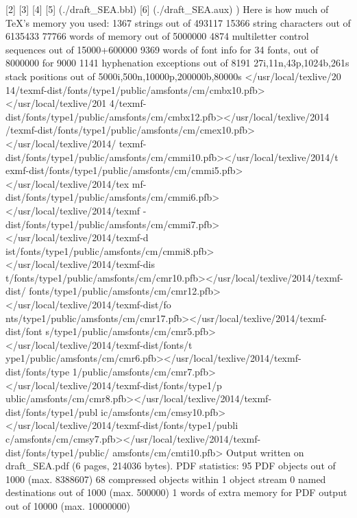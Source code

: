 [2] [3] [4] [5] (./draft_SEA.bbl) [6] (./draft_SEA.aux) ) 
Here is how much of TeX's memory you used:
 1367 strings out of 493117
 15366 string characters out of 6135433
 77766 words of memory out of 5000000
 4874 multiletter control sequences out of 15000+600000
 9369 words of font info for 34 fonts, out of 8000000 for 9000
 1141 hyphenation exceptions out of 8191
 27i,11n,43p,1024b,261s stack positions out of 5000i,500n,10000p,200000b,80000s
</usr/local/texlive/20
14/texmf-dist/fonts/type1/public/amsfonts/cm/cmbx10.pfb></usr/local/texlive/201
4/texmf-dist/fonts/type1/public/amsfonts/cm/cmbx12.pfb></usr/local/texlive/2014
/texmf-dist/fonts/type1/public/amsfonts/cm/cmex10.pfb></usr/local/texlive/2014/
texmf-dist/fonts/type1/public/amsfonts/cm/cmmi10.pfb></usr/local/texlive/2014/t
exmf-dist/fonts/type1/public/amsfonts/cm/cmmi5.pfb></usr/local/texlive/2014/tex
mf-dist/fonts/type1/public/amsfonts/cm/cmmi6.pfb></usr/local/texlive/2014/texmf
-dist/fonts/type1/public/amsfonts/cm/cmmi7.pfb></usr/local/texlive/2014/texmf-d
ist/fonts/type1/public/amsfonts/cm/cmmi8.pfb></usr/local/texlive/2014/texmf-dis
t/fonts/type1/public/amsfonts/cm/cmr10.pfb></usr/local/texlive/2014/texmf-dist/
fonts/type1/public/amsfonts/cm/cmr12.pfb></usr/local/texlive/2014/texmf-dist/fo
nts/type1/public/amsfonts/cm/cmr17.pfb></usr/local/texlive/2014/texmf-dist/font
s/type1/public/amsfonts/cm/cmr5.pfb></usr/local/texlive/2014/texmf-dist/fonts/t
ype1/public/amsfonts/cm/cmr6.pfb></usr/local/texlive/2014/texmf-dist/fonts/type
1/public/amsfonts/cm/cmr7.pfb></usr/local/texlive/2014/texmf-dist/fonts/type1/p
ublic/amsfonts/cm/cmr8.pfb></usr/local/texlive/2014/texmf-dist/fonts/type1/publ
ic/amsfonts/cm/cmsy10.pfb></usr/local/texlive/2014/texmf-dist/fonts/type1/publi
c/amsfonts/cm/cmsy7.pfb></usr/local/texlive/2014/texmf-dist/fonts/type1/public/
amsfonts/cm/cmti10.pfb>
Output written on draft_SEA.pdf (6 pages, 214036 bytes).
PDF statistics:
 95 PDF objects out of 1000 (max. 8388607)
 68 compressed objects within 1 object stream
 0 named destinations out of 1000 (max. 500000)
 1 words of extra memory for PDF output out of 10000 (max. 10000000)

